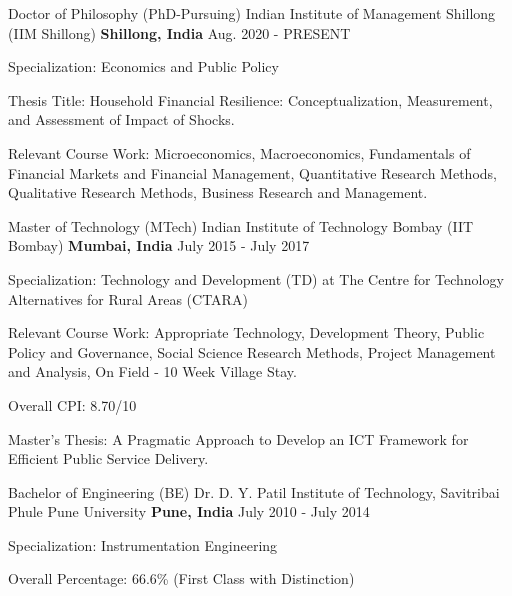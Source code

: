 
\begin{cventries}

\cventry
{Doctor of Philosophy (PhD-Pursuing)} %
{Indian Institute of Management Shillong (IIM Shillong)} %
{\textbf{Shillong, India}} %
{Aug. 2020 - PRESENT} %
{ %
\begin{cvitems}
\item {Specialization: Economics and Public Policy}
\item{Thesis Title: Household  Financial Resilience: Conceptualization, Measurement, and Assessment of Impact of Shocks.}
\item {Relevant Course Work: Microeconomics, Macroeconomics, Fundamentals of Financial Markets and Financial Management, Quantitative Research Methods, Qualitative Research Methods, Business Research and Management.}
\end{cvitems}
}
\end{cventries}
\cventry
{Master of Technology (MTech)} %
{Indian Institute of Technology Bombay (IIT Bombay)} %
{\textbf{Mumbai, India}} %
{July 2015 - July 2017} %
{ %
\begin{cvitems}
\item {Specialization: Technology and Development (TD) at The Centre for Technology Alternatives for Rural Areas (CTARA)}
\item {Relevant Course Work: Appropriate Technology, Development Theory, Public Policy and Governance, Social Science Research Methods, Project Management and Analysis, On Field - 10 Week Village Stay.}
\item {Overall CPI: 8.70/10} 
\item{Master's Thesis: A Pragmatic Approach to Develop an ICT Framework for Efficient Public Service Delivery.}
\end{cvitems}
}
\cventry
{Bachelor of Engineering (BE)} %
{Dr. D. Y. Patil Institute of Technology, Savitribai Phule Pune University} %
{\textbf{Pune, India}} %
{July 2010 - July 2014} %
{ %
\begin{cvitems}
\item {Specialization: Instrumentation Engineering}
\item {Overall Percentage: 66.6\% (First Class with Distinction)}
\
\end{cvitems}
}
